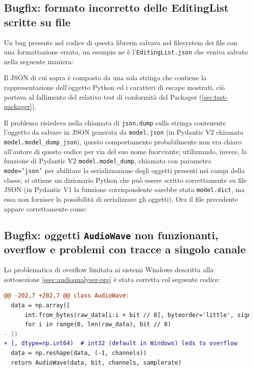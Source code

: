 \subsection{Bugfix: formato incorretto delle EditingList scritte su file} \label{ssec:mpaicaearp-formato-editinglist}
Un bug presente nel codice di questa libreria salvava nel filesystem dei file con una formattazione errata, un esempio ne è l'\texttt{EditingList.json} che veniva salvato nella seguente maniera:

Il JSON di cui sopra è composto da una sola stringa che contiene la rappresentazione dell'oggetto Python ed i caratteri di escape mostrati, ciò portava al fallimento del relativo test di conformità del Packager (\ref{sec:test-packager}).

Il problema risiedeva nella chiamata di \texttt{json.dump} sulla stringa contenente l'oggetto da salvare in JSON generata da \texttt{model.json} (in Pydantic V2 chiamata \verb|model.model_dump_json|), questo comportamento probabilmente non era chiaro all'autore di questo codice per via del suo nome fuorviante; utilizzando, invece, la funzione di Pydantic V2 \verb|model.model_dump|, chiamata con parametro \texttt{mode='json'} per abilitare la serializzazione degli oggetti presenti nei campi della classe, si ottiene un dizionario Python che può essere scritto correttamente su file JSON (in Pydantic V1 la funzione corrispondente sarebbe stata \texttt{model.dict}, ma essa non fornisce la possibilità di serializzare gli oggetti).
Ora il file precedente appare correttamente come:



\subsection{Bugfix: oggetti \texttt{AudioWave} non funzionanti, overflow e problemi con tracce a singolo canale} \label{ssec:mpaicaearp-audiowave}  %
La problematica di overflow limitata ai sistemi Windows descritta alla sottosezione \ref{ssec:audioanalyser-pre} è stata corretta col seguente codice:
\begin{lstlisting}[language=diff]
@@ -202,7 +202,7 @@ class AudioWave:
  data = np.array([
      int.from_bytes(raw_data[i:i + bit // 8], byteorder='little', signed=True)
      for i in range(0, len(raw_data), bit // 8)
- ])
+ ], dtype=np.int64)  # int32 (default in Windows) leds to overflow
  data = np.reshape(data, (-1, channels))
  return AudioWave(data, bit, channels, samplerate)
\end{lstlisting}

